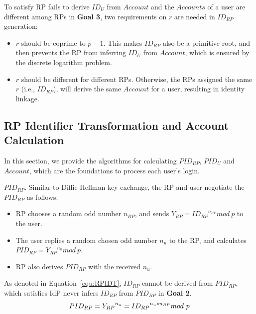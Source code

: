 To satisfy RP fails to derive $ID_U$ from $Account$ and the $Accounts$ of a user are different among RPs in \textbf{Goal 3}, two requirements on $r$ are needed  in $ID_{RP}$ generation:
\begin{itemize}
  \item $r$ should be coprime to $p-1$. This makes $ID_{RP}$ also be  a primitive root, and then prevents the RP from inferring $ID_U$ from $Account$, which is  ensured by the discrete logarithm problem.

  \item  $r$ should be different for different RPs. Otherwise, the RPs assigned the same $r$ (i.e., $ID_{RP}$), will derive the same $Account$ for a user, resulting in identity linkage. %
\end{itemize}





\subsection{RP Identifier Transformation and Account Calculation}
\label{subsec:identifier-generation}
In this section, we provide the algorithms for  calculating  $PID_{RP}$, $PID_U$ and $Account$,
which are the foundations to process each user's login. %

\noindent\textbf{$PID_{RP}$}. Similar to Diffie-Hellman key exchange\cite{DiffieH76}, the RP and user negotiate the  $PID_{RP}$ as follows:
\begin{itemize}
  \item RP chooses a random odd number $n_{RP}$, and sends $Y_{RP} = {ID_{RP}}^{n_{RP}} mod \ p$ to the user.
  \item The user replies a random chosen odd number $n_{u}$ to the RP, and calculates $PID_{RP} = {Y_{RP}}^{n_{u}} mod \ p$.
  \item RP also derives $PID_{RP}$ with the received $n_{u}$.
\end{itemize}

As denoted in Equation~\ref{equ:RPIDT}, ${ID_{RP}}$ cannot be derived from $PID_{RP}$, which satisfies IdP never infers ${ID_{RP}}$ from $PID_{RP}$ in \textbf{Goal 2}.
   \begin{equation}
   PID_{RP} = {Y_{RP}}^{n_{u}} = {ID_{RP}}^{n_{u}* n_{RP}} mod \ p
   \label{equ:ID_{RP}T}
   \end{equation}

